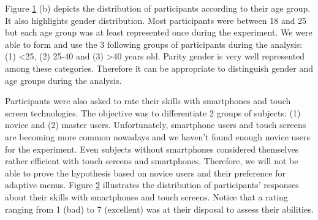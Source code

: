\begin{figure}[!ht]
    
    \label{fig:participants}
\end{figure}

Figure \ref{fig:participants} (b) depicts the distribution 
of participants according to their age group. It also highlights gender 
distribution. Most participants were between 18 and 25 but each age group was 
at 
least represented once during the experiment. We were able to form and use the 
3 
following groups of participants during the analysis: (1) <25, (2) 25-40 and 
(3) >40 years old. Parity gender is very well represented among these 
categories. Therefore it can be appropriate to distinguish gender and age groups 
during the analysis.\newline

Participants were also asked to rate their skills with smartphones and 
touch screen technologies. The objective was to differentiate 2 groups of 
subjects: (1) novice and (2) master users. Unfortunately, smartphone users 
and touch screens are becoming more common nowadays and we haven't found 
enough novice users for the experiment. Even subjects without smartphones 
considered themselves rather efficient with touch screens and smartphones. 
Therefore, we will not be able to prove the hypothesis based on novice 
users and their preference for adaptive menus. Figure 
\ref{fig:participants_skills} illustrates the distribution of participants' 
responses about their skills with smartphones and 
touch screens. Notice that a rating ranging from 1 (bad) to 7 (excellent) was 
at their disposal to assess their abilities.

\begin{figure}[!ht]
    
    \label{fig:participants_skills}
\end{figure}

